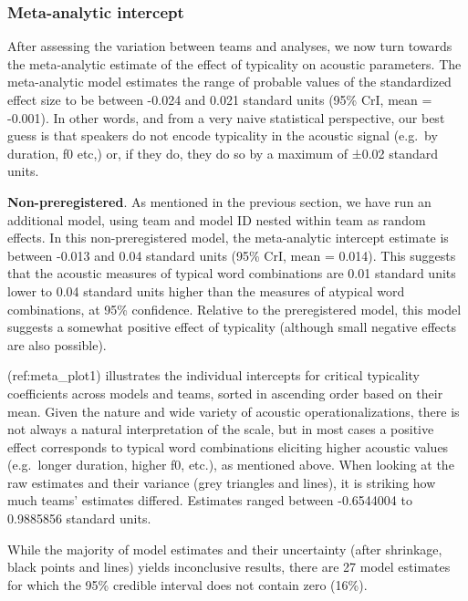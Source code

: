 \documentclass[Review,times,sageh]{sagej}
\begin{document}
\hypertarget{meta-analytic-intercept}{%
\subsubsection{Meta-analytic intercept}\label{meta-analytic-intercept}}

After assessing the variation between teams and analyses, we now turn towards the meta-analytic estimate of the effect of typicality on acoustic parameters.
The meta-analytic model estimates the range of probable values of the standardized effect size to be between -0.024 and 0.021 standard units (95\% CrI, mean = -0.001).
In other words, and from a very naive statistical perspective, our best guess is that speakers do not encode typicality in the acoustic signal (e.g.~by duration, f0 etc,) or, if they do, they do so by a maximum of ±0.02 standard units.

\textbf{Non-preregistered}. As mentioned in the previous section, we have run an additional model, using team and model ID nested within team as random effects.
In this non-preregistered model, the meta-analytic intercept estimate is between -0.013 and 0.04 standard units (95\% CrI, mean = 0.014).
This suggests that the acoustic measures of typical word combinations are 0.01 standard units lower to 0.04 standard units higher than the measures of atypical word combinations, at 95\% confidence.
Relative to the preregistered model, this model suggests a somewhat positive effect of typicality (although small negative effects are also possible).

(ref:meta\_plot1) illustrates the individual intercepts for critical typicality coefficients across models and teams, sorted in ascending order based on their mean.
Given the nature and wide variety of acoustic operationalizations, there is not always a natural interpretation of the scale, but in most cases a positive effect corresponds to typical word combinations eliciting higher acoustic values (e.g.~longer duration, higher f0, etc.), as mentioned above.
When looking at the raw estimates and their variance (grey triangles and lines), it is striking how much teams' estimates differed.
Estimates ranged between -0.6544004 to 0.9885856 standard units.

While the majority of model estimates and their uncertainty (after shrinkage, black points and lines) yields inconclusive results, there are 27 model estimates for which the 95\% credible interval does not contain zero (16\%).
\end{document}
